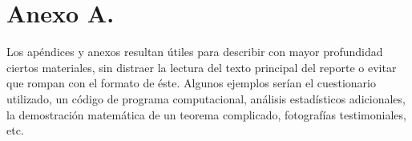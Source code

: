 \fancyhead{}
\fancyfoot{}
\cfoot{\thepage}


\chapter{Anexo A.}
Los apéndices y anexos resultan útiles para describir con mayor profundidad ciertos materiales, sin distraer la lectura del texto principal del reporte o evitar que rompan con el formato de éste. Algunos ejemplos serían el cuestionario utilizado, un código de programa computacional, análisis estadísticos adicionales, la demostración matemática de un teorema complicado, fotografías testimoniales, etc.

